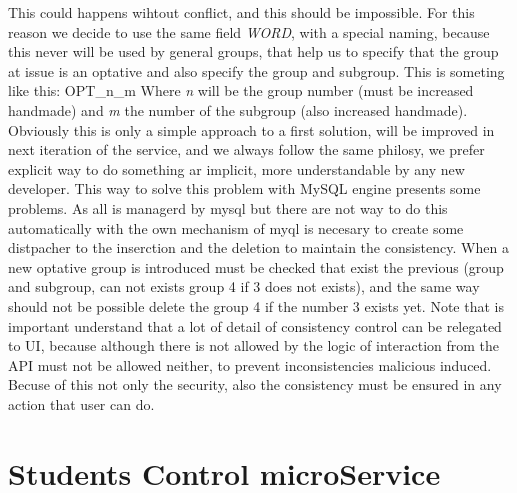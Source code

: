 \noindent This could happens wihtout conflict, and this should be impossible.
For this reason we decide to use the same field \textit{WORD}, with a special
naming, because this never will be used by general groups, that help us to
specify that the group at issue is an optative and also specify the group
and subgroup.
\intro
This is someting like this: OPT\_n\_m
Where \textit{n} will be the group number (must be increased handmade) and \textit{m}
the number of the subgroup (also increased handmade).
Obviously this is only a simple approach to a first solution, will be improved
in next iteration of the service, and we always follow the same philosy,
we prefer explicit way to do something ar implicit, more understandable by
any new developer.
\intro
This way to solve this problem with MySQL engine presents some problems.
As all is managerd by mysql but there are not way to do this automatically
with the own mechanism of myql is necesary to create some distpacher to the
inserction and the deletion to maintain the consistency. When a new optative group
is introduced must be checked that exist the previous (group and subgroup, can not
exists group 4 if 3 does not exists), and the same way should not be possible
delete the group 4 if the number 3 exists yet.
\intro
Note that is important understand that a lot of detail of consistency control
can be relegated to UI, because although there is not allowed by the logic
of interaction from the API must not be allowed neither, to prevent
inconsistencies malicious induced.
\intro
Becuse of this not only the security, also the consistency must be ensured in
any action that user can do.


\section{Students Control microService}

